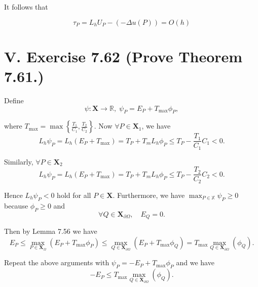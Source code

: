 \documentclass[twoside,a4paper]{article}
\begin{document}
It follows that

\begin{equation*}
	\tau_P = L_hU_P - (-\Delta u(P)) = O(h)
\end{equation*}


\section*{V. Exercise 7.62 (Prove Theorem 7.61.)}

\;\;\;\; Define
\begin{equation*}
	\psi:\mathbf{X}\to\mathbb{R},\;\psi_P=E_P+T_\text{max}\phi_P,
\end{equation*}

where $T_\text{max}=\max\left\{\frac{T_1}{C_1},\frac{T_2}{C_2}\right\}$. Now $\forall P\in\mathbf{X}_1$, we have
\begin{equation*}
	L_h\psi_P=L_h(E_P+T_\text{max})=T_P+T_mL_h\phi_P\leq T_P-\frac{T_1}{C_1}C_1<0.
\end{equation*}

Similarly, $\forall P\in\mathbf{X}_2$
\begin{equation*}
	L_h\psi_P=L_h(E_P+T_\text{max})=T_P+T_mL_h\phi_P\leq T_P-\frac{T_2}{C_2}C_2<0.
\end{equation*}

Hence $L_h\psi_P<0$ hold for all $P\in\mathbf{X}$. Furthermore, we have $\max_{P\in\mathbb{X}} \psi_P\geq 0$ because $\phi_P\geq 0$ and
\begin{equation*}
	\forall Q\in\mathbf{X}_{\partial \Omega},\quad E_Q=0.
\end{equation*}

Then by Lemma 7.56 we have
\begin{equation*}
	E_P\leq \max_{P\in\mathbf{X}_\Omega}(E_P+T_\text{max}\phi_P)\leq \max_{Q\in\mathbf{X}_{\partial\Omega}}(E_P+T_\text{max}\phi_Q)=T_\text{max}\max_{Q\in\mathbf{X}_{\partial\Omega}}(\phi_Q).
\end{equation*}

Repeat the above arguments with $\psi_P=-E_P+T_\text{max}\phi_P$ and we have
\begin{equation*}
	-E_P\leq T_\text{max} \max_{Q\in\mathbf{X}_{\partial\Omega}}(\phi_Q).
\end{equation*}
\end{document}
